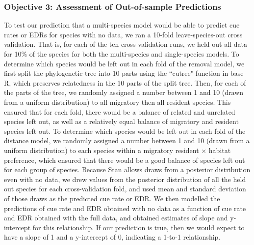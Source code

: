 \subsubsection{Objective 3: Assessment of Out-of-sample Predictions}
\par To test our prediction that a multi-species model would be able to predict cue rates or EDRs for species with no data, we ran a 10-fold leave-species-out cross validation.
That is, for each of the ten cross-validation runs, we held out all data for 10\% of the species for both the multi-species and single-species models.
To determine which species would be left out in each fold of the removal model, we first split the phylogenetic tree into 10 parts using the ``cutree" function in base R, which preserves relatedness in the 10 parts of the split tree.
Then, for each of the parts of the tree, we randomly assigned a number between 1 and 10 (drawn from a uniform distribution) to all migratory then all resident species.
This ensured that for each fold, there would be a balance of related and unrelated species left out, as well as a relatively equal balance of migratory and resident species left out.
To determine which species would be left out in each fold of the distance model, we randomly assigned a number between 1 and 10 (drawn from a uniform distribution) to each species within a migratory resident $\times$ habitat preference, which ensured that there would be a good balance of species left out for each group of species.
Because Stan allows draws from a posterior distribution even with no data, we drew values from the posterior distribution of all the held out species for each cross-validation fold, and used mean and standard deviation of those draws as the predicted cue rate or EDR.
We then modelled the predictions of cue rate and EDR obtained with no data as a function of cue rate and EDR obtained with the full data, and obtained estimates of slope and y-intercept for this relationship.
If our prediction is true, then we would expect to have a slope of 1 and a y-intercept of 0, indicating a 1-to-1 relationship.

